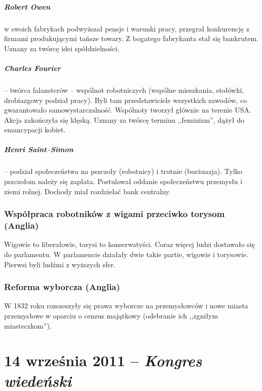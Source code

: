 \documentclass [a4paper, 11pt, oneside]{book}
\begin{document}
            \paragraph{Robert Owen} w swoich fabrykach podwyższał pensje i warunki pracy, przegrał konkurencję z firmami produkującymi tańsze towary. Z bogatego fabrykanta stał się bankrutem. Uznany za twórcę idei spółdzielności.
            \paragraph{Charles Fourier} -- twórca falansterów -- wspólnot robotniczych (wspólne mieszkania, stołówki, drobiazgowy podział pracy). Byli tam przedstawiciele wszystkich zawodów, co gwarantowało samowystarczalność. Wspólnoty tworzył głównie na terenie USA. Akcja zakończyła się klęską. Uznany za twórcę terminu ,,feminizm'', dążył do emancypacji kobiet.
            \paragraph{Henri Saint--Simon} -- podział społeczeństwa na pszczoły (robotnicy) i trutnie (burżuazja). Tylko pszczołom należy się zapłata. Postulował oddanie społeczeństwu przemysłu i ziemi rolnej. Dochody miał rozdzielać bank centralny.

        \subsection{Współpraca robotników z wigami przeciwko torysom (Anglia)} %
        \label{sub:wsp_praca_robotnik_w_z_wigami}
            Wigowie to liberałowie, torysi to konserwatyści. Coraz więcej ludzi dostawało się do parlamentu. W parlamencie działały dwie takie partie, wigowie i torysowie. Pierwsi byli ludźmi z wyższych sfer. 

        \subsection{Reforma wyborcza (Anglia)} %
        \label{sub:reforma_wyborcza}
            W 1832 roku rozszeszyły się prawa wyborcze na przemysłowców i nowe miasta przemysłowe w oparciu o cenzus majątkowy (odebranie ich ,,zgniłym miasteczkom'').

\chapter{14 września 2011 -- \textit{Kongres wiedeński}} %
\label{cha:14_wrze_nia_2011_textit}
\end{document}
